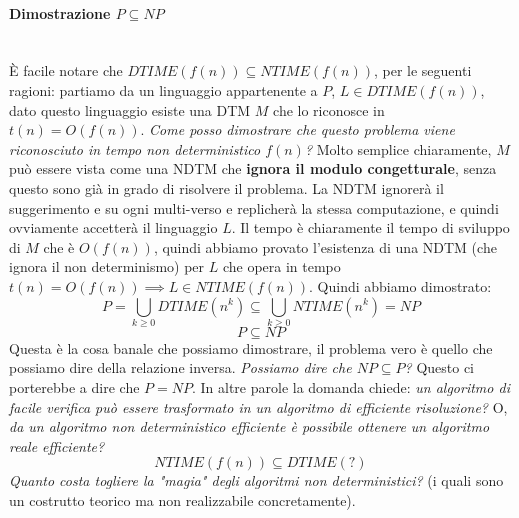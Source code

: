 \documentclass{article}
\begin{document}
\paragraph{Dimostrazione $P\subseteq NP$}\mbox{}\\
È facile notare che $DTIME(f(n))\subseteq NTIME(f(n))$, per le seguenti ragioni:
partiamo da un linguaggio appartenente a $P$, $L\in DTIME(f(n))$, dato questo linguaggio
esiste una DTM $M$ che lo riconosce in $t(n)=O(f(n))$.
\newline\newline
\textit{Come posso dimostrare che questo problema viene riconosciuto in
    tempo non deterministico $f(n)$?}
\newline\newline
Molto semplice chiaramente, $M$ può
essere vista come una NDTM che \textbf{ignora il modulo congetturale},
senza questo sono già in grado di risolvere il problema.
La NDTM ignorerà il suggerimento e su ogni
multi-verso e replicherà la stessa computazione, e quindi ovviamente accetterà il linguaggio
$L$. Il tempo è chiaramente il tempo di sviluppo di $M$ che è $O(f(n))$, quindi
abbiamo provato l'esistenza di una NDTM (che ignora il non
determinismo) per $L$ che opera in tempo $t(n)=O(f(n))\implies L\in NTIME(f(n))$.
\newline\newline
Quindi abbiamo dimostrato:
$$P=\bigcup_{k\geq 0}DTIME(n^k)\subseteq \bigcup_{k\geq 0}NTIME(n^k)=NP$$
$$P\subseteq NP$$
Questa è la cosa banale che possiamo dimostrare, il problema vero è quello che possiamo dire
della relazione inversa. \textit{Possiamo dire che $NP\subseteq P$?} Questo ci porterebbe
a dire che $P=NP$.
\newline\newline
In altre parole la domanda chiede: \textit{un algoritmo di facile verifica può
    essere trasformato in un algoritmo di efficiente risoluzione?} O, \textit{da un algoritmo
    non deterministico efficiente è possibile ottenere un algoritmo
    reale efficiente?}
$$NTIME(f(n))\subseteq DTIME(?)$$
\textit{Quanto costa togliere la "magia" degli algoritmi
    non deterministici?} (i quali sono un costrutto teorico ma non realizzabile concretamente).
\end{document}
